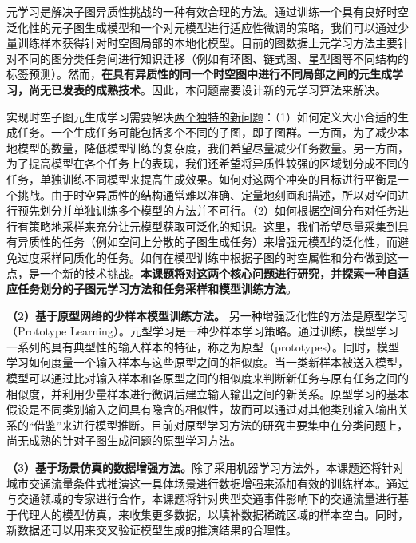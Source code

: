 \documentclass[12pt,UTF8,AutoFakeBold=2,a4paper]{ctexart} %
\newcommand{\xz}[1]{\textcolor{red}{[XZ: #1]}}
\begin{document}
元学习是解决子图异质性挑战的一种有效合理的方法。通过训练一个具有良好时空泛化性的元子图生成模型和一个对元模型进行适应性微调的策略，我们可以通过少量训练样本获得针对时空图局部的本地化模型。目前的图数据上元学习方法主要针对不同的图分类任务间进行知识迁移（例如有环图、链式图、星型图等不同结构的标签预测）。然而，\textbf{在具有异质性的同一个时空图中进行不同局部之间的元生成学习，尚无已发表的成熟技术}。因此，本问题需要设计新的元学习算法来解决。

实现时空子图元生成学习需要解决\underline{两个独特的新问题}：（1）如何定义大小合适的生成任务。一个生成任务可能包括多个不同的子图，即子图群。一方面，为了减少本地模型的数量，降低模型训练的复杂度，我们希望尽量减少任务数量。另一方面，为了提高模型在各个任务上的表现，我们还希望将异质性较强的区域划分成不同的任务，单独训练不同模型来提高生成效果。如何对这两个冲突的目标进行平衡是一个挑战。由于时空异质性的结构通常难以准确、定量地刻画和描述，所以对空间进行预先划分并单独训练多个模型的方法并不可行。（2）如何根据空间分布对任务进行有策略地采样来充分让元模型获取可泛化的知识。这里，我们希望尽量采集到具有异质性的任务（例如空间上分散的子图生成任务）来增强元模型的泛化性，而避免过度采样同质化的任务。如何在模型训练中根据子图的时空属性和分布做到这一点，是一个新的技术挑战。\textbf{本课题将对这两个核心问题进行研究，并探索一种自适应任务划分的子图元学习方法和任务采样和模型训练方法}。

\textbf{（2）基于原型网络的少样本模型训练方法。}
另一种增强泛化性的方法是原型学习（Prototype Learning）。元型学习是一种少样本学习策略。通过训练，模型学习一系列的具有典型性的输入样本的特征，称之为原型（prototypes）。同时，模型学习如何度量一个输入样本与这些原型之间的相似度。当一类新样本被送入模型，模型可以通过比对输入样本和各原型之间的相似度来判断新任务与原有任务之间的相似度，并利用少量样本进行微调后建立输入输出之间的新关系。原型学习的基本假设是不同类别输入之间具有隐含的相似性，故而可以通过对其他类别输入输出关系的``借鉴''来进行模型推断。目前对原型学习方法的研究主要集中在分类问题上，尚无成熟的针对子图生成问题的原型学习方法。%

\textbf{（3）基于场景仿真的数据增强方法。}除了采用机器学习方法外，本课题还将针对城市交通流量条件式推演这一具体场景进行数据增强来添加有效的训练样本。通过与交通领域的专家进行合作，本课题将针对典型交通事件影响下的交通流量进行基于代理人的模型仿真，来收集更多数据，以填补数据稀疏区域的样本空白。同时，新数据还可以用来交叉验证模型生成的推演结果的合理性。
\end{document}
